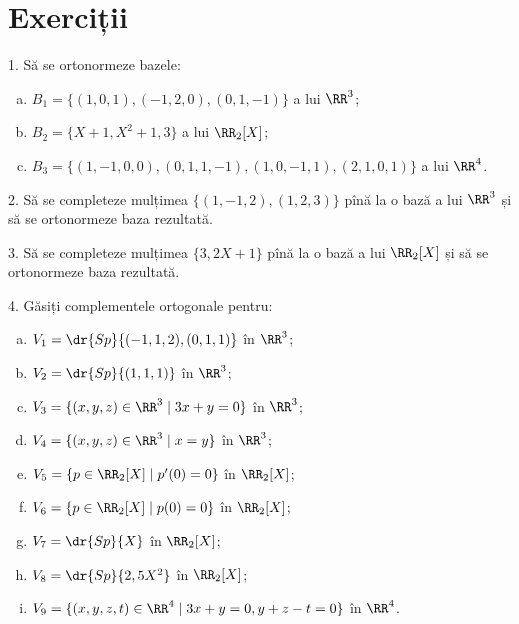 
\section{Exerciții}

1. Să se ortonormeze bazele:
\begin{enumerate}[(a)]
\item $ B_1 = \{ (1, 0, 1), (-1, 2, 0), (0, 1, -1) \} $ a lui $ \RR^3 $;
\item $ B_2 = \{ X + 1, X^2 + 1, 3 \} $ a lui $ \RR_2[X] $;
\item $ B_3 = \{ (1, -1, 0, 0), (0, 1, 1, -1), (1, 0, -1, 1), (2, 1, 0, 1) \} $
  a lui $ \RR^4 $.
\end{enumerate}

\vspace{0.5cm}

2. Să se completeze mulțimea $ \{ (1, -1, 2), (1, 2, 3) \} $ pînă la o bază
a lui $ \RR^3 $ și să se ortonormeze baza rezultată.

\vspace{0.5cm}

3. Să se completeze mulțimea $ \{ 3, 2X + 1 \} $ pînă la o bază a lui $ \RR_2[X] $
și să se ortonormeze baza rezultată.

\vspace{0.5cm}

4. Găsiți complementele ortogonale pentru:
\begin{enumerate}[(a)]
\item $ V_1 = \dr{Sp} \{ (-1, 1, 2), (0, 1, 1) \} $ în $ \RR^3 $;
\item $ V_2 = \dr{Sp} \{ (1, 1, 1) \} $ în $ \RR^3 $;
\item $ V_3 = \{ (x, y, z) \in \RR^3 \mid 3x + y = 0 \} $ în $ \RR^3 $;
\item $ V_4 = \{ (x, y, z) \in \RR^3 \mid x = y \} $ în $ \RR^3 $;
\item $ V_5 = \{ p \in \RR_2[X] \mid p'(0) = 0 \} $ în $\RR_2[X] $;
\item $ V_6 = \{ p \in \RR_2[X] \mid p(0) = 0 \} $ în $ \RR_2[X] $;
\item $ V_7 = \dr{Sp}\{ X \} $ în $ \RR_2[X] $;
\item $ V_8 = \dr{Sp} \{ 2, 5X^2 \} $ în $ \RR_2[X] $;
\item $ V_9 = \{ (x, y, z, t) \in \RR^4 \mid 3x + y = 0, y + z - t = 0 \} $
  în $ \RR^4 $.
\end{enumerate}

